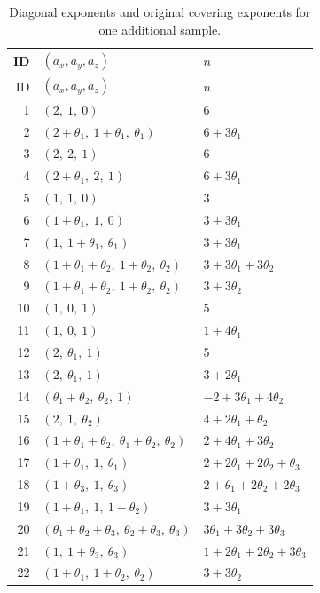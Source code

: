 \documentclass[11pt]{amsart}
\theoremstyle{definition}
\theoremstyle{remark}
\numberwithin{equation}{section}
\begin{document}
{\small
\begin{longtable}{r p{} p{}}
\caption{Diagonal exponents and original covering exponents for one additional sample.}\label{reg:all-costs}\\
ID & $(a_x,a_y,a_z)$ & $n$\\\hline
\endfirsthead
ID & $(a_x,a_y,a_z)$ & $n$\\\hline
\endhead
1 & $(2,\ 1,\ 0)$ & $6$\\
2 & $(2+\theta_1,\ 1+\theta_1,\ \theta_1)$ & $6+3\theta_1$\\
3 & $(2,\ 2,\ 1)$ & $6$\\
4 & $(2+\theta_1,\ 2,\ 1)$ & $6+3\theta_1$\\
5 & $(1,\ 1,\ 0)$ & $3$\\
6 & $(1+\theta_1,\ 1,\ 0)$ & $3+3\theta_1$\\
7 & $(1,\ 1+\theta_1,\ \theta_1)$ & $3+3\theta_1$\\
8 & $(1+\theta_1+\theta_2,\ 1+\theta_2,\ \theta_2)$ & $3+3\theta_1+3\theta_2$\\
9 & $(1+\theta_1+\theta_2,\ 1+\theta_2,\ \theta_2)$ & $3+3\theta_2$\\
10 & $(1,\ 0,\ 1)$ & $5$\\
11 & $(1,\ 0,\ 1)$ & $1+4\theta_1$\\
12 & $(2,\ \theta_1,\ 1)$ & $5$\\
13 & $(2,\ \theta_1,\ 1)$ & $3+2\theta_1$\\
14 & $(\theta_1+\theta_2,\ \theta_2,\ 1)$ & $-2+3\theta_1+4\theta_2$\\
15 & $(2,\ 1,\ \theta_2)$ & $4+2\theta_1+\theta_2$\\
16 & $(1+\theta_1+\theta_2,\ \theta_1+\theta_2,\ \theta_2)$ & $2+4\theta_1+3\theta_2$\\
17 & $(1+\theta_1,\ 1,\ \theta_1)$ & $2+2\theta_1+2\theta_2+\theta_3$\\
18 & $(1+\theta_3,\ 1,\ \theta_3)$ & $2+\theta_1+2\theta_2+2\theta_3$\\
19 & $(1+\theta_1,\ 1,\ 1-\theta_2)$ & $3+3\theta_1$\\
20 & $(\theta_1+\theta_2+\theta_3,\ \theta_2+\theta_3,\ \theta_3)$ & $3\theta_1+3\theta_2+3\theta_3$\\
21 & $(1,\ 1+\theta_3,\ \theta_3)$ & $1+2\theta_1+2\theta_2+3\theta_3$\\
22 & $(1+\theta_1,\ 1+\theta_2,\ \theta_2)$ & $3+3\theta_2$\\
\end{longtable}
}
\end{document}
